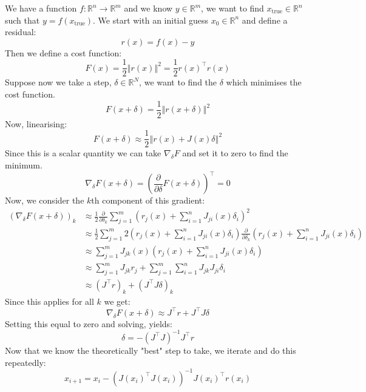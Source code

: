 \documentclass[12pt,a4paper]{report}
\theoremstyle{definition}
\begin{document}
We have a function $f : \mathbb{R}^n \rightarrow \mathbb{R}^m$ and we know $y \in \mathbb{R}^m$, we want to find $x_{\text{true}} \in \mathbb{R}^n$ such that $y = f(x_{\text{true}})$. We start with an initial guess $x_0 \in \mathbb{R}^n$ and define a residual:
\begin{equation}
  r(x) = f(x) - y
\end{equation}
Then we define a cost function: 
\begin{equation}
  F(x) = \frac{1}{2} \left \Vert r(x) \right \Vert^2 = \frac{1}{2} r(x)^{\top}r(x)
  \label{eq:cost_function}
\end{equation}
Suppose now we take a step, $\delta \in \mathbb{R}^N$, we want to find the $\delta$ which minimises the cost function.
\begin{equation}
  F(x + \delta) = \frac{1}{2} \left\Vert r(x + \delta) \right\Vert^2 
\end{equation}
Now, linearising:
\begin{equation}
  F(x + \delta) \approx \frac{1}{2} \left\Vert r(x) + J(x)\delta \right\Vert^2 
\end{equation}
Since this is a scalar quantity we can take $\nabla_\delta F$ and set it to zero to find the minimum.
\begin{equation}
  \nabla_\delta F(x + \delta) = \left(\frac{\partial}{\partial \delta} F(x + \delta)\right)^\top = 0
\end{equation}
Now, we consider the $k$th component of this gradient:
\begin{align}
  \left(\nabla_\delta F(x + \delta)\right)_k
    &\approx \frac{1}{2}\frac{\partial}{\partial \delta_k} \sum_{j = 1}^{m} \left(r_j(x) + \sum_{i=1}^n J_{ji}(x)\delta_i \right)^2 \\
    &\approx \frac{1}{2} \sum_{j = 1}^m 2\left(r_j(x) + \sum_{i=1}^n J_{ji}(x)\delta_i\right)\frac{\partial}{\partial \delta_k}\left(r_j(x) + \sum_{i=1}^n J_{ji}(x)\delta_i\right) \\
    &\approx \sum_{j = 1}^m J_{jk}(x)\left(r_j(x) + \sum_{i=1}^n J_{ji}(x)\delta_i\right) \\
    &\approx \sum_{j = 1}^m J_{jk} r_j + \sum_{j = 1}^m \sum_{i=1}^n J_{jk} J_{ji}\delta_i \\
    &\approx \left( J^\top r \right)_k + (J^\top J \delta)_k
\end{align}
Since this applies for all $k$ we get:
\begin{equation}
  \nabla_\delta F(x + \delta) \approx J^\top r + J^\top J \delta
\end{equation}
Setting this equal to zero and solving, yields:
\begin{equation}
  \delta = -\left(J^\top J\right)^{-1} J^\top r 
\end{equation}
Now that we know the theoretically "best" step to take, we iterate and do this repeatedly:
\begin{equation}
  x_{i + 1} = x_i - \left(J(x_i)^\top J(x_i)\right)^{-1}J(x_i)^\top r(x_i)
\end{equation}
\end{document}
